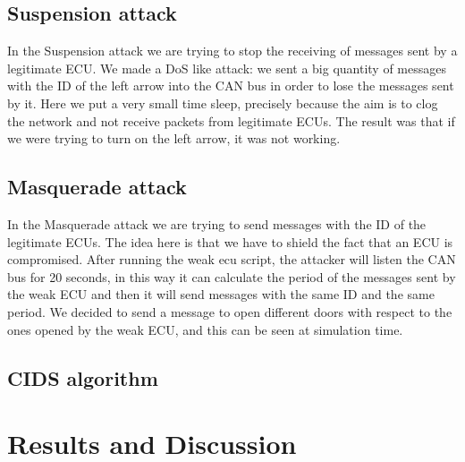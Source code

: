 \documentclass[12pt]{article}
\begin{document}
\subsection{Suspension attack}
In the Suspension attack we are trying to stop the receiving of messages sent by a legitimate ECU. We made a DoS like attack: we sent a big quantity of messages with the ID of the left arrow into the CAN bus in order to lose the messages sent by it. Here we put a very small time sleep, precisely because the aim is to clog the network and not receive packets from legitimate ECUs. The result was that if we were trying to turn on the left arrow, it was not working.
\subsection{Masquerade attack}
In the Masquerade attack we are trying to send messages with the ID of the legitimate ECUs. The idea here is that we have to shield the fact that an ECU is compromised. After running the weak ecu script, the attacker will listen the CAN bus for 20 seconds, in this way it can calculate the period of the messages sent by the weak ECU and then it will send messages with the same ID and the same period. We decided to send a message to open different doors with respect to the ones opened by the weak ECU, and this can be seen at simulation time.
\subsection{CIDS algorithm}
\section{Results and Discussion}
\printbibliography 
\end{document}
